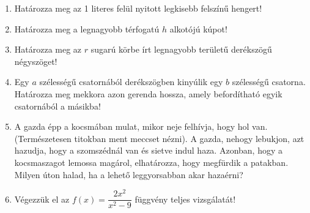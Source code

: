 \documentclass[a4paper, 12pt]{scrartcl}
\begin{document}
\begin{enumerate}
  \item Határozza meg az 1 literes felül nyitott legkisebb felszínű hengert!

  \item Határozza meg a legnagyobb térfogatú $h$ alkotójú kúpot!

  \item Határozza meg az $r$ sugarú körbe írt legnagyobb területű derékszögű
        négyszöget!

  \item Egy $a$ szélességű csatornából derékszögben kinyúlik egy $b$ szélességű
        csatorna. Határozza meg mekkora azon gerenda hossza, amely befordítható
        egyik csatornából a másikba!

  \item A gazda épp a kocsmában mulat, mikor neje felhívja, hogy hol van.
        (Természetesen titokban ment meccset nézni). A gazda, nehogy lebukjon,
        azt hazudja, hogy a szomszédnál van és sietve indul haza. Azonban, hogy
        a kocsmaszagot lemossa magárol, elhatározza, hogy megfürdik a patakban.
        Milyen úton halad, ha a lehető leggyorsabban akar hazaérni?
        \begin{center}
        \end{center}

  \item Végezzük el az $f(x) = \dfrac{2x^2}{x^2 - 9}$ függvény teljes
        vizsgálatát!
\end{enumerate}

\end{document}
